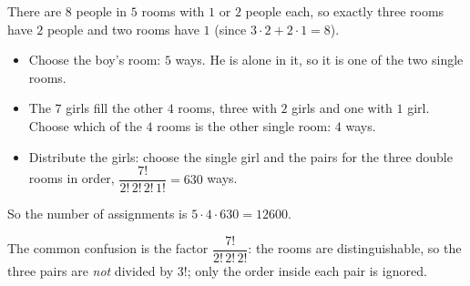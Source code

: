 There are $8$ people in $5$ rooms with $1$ or $2$ people each, so exactly three rooms have $2$ people and two rooms have $1$ (since $3\cdot2+2\cdot1=8$).

\begin{itemize}
\item Choose the boy's room: $5$ ways. He is alone in it, so it is one of the two single rooms.
\item The $7$ girls fill the other $4$ rooms, three with $2$ girls and one with $1$ girl. Choose which of the $4$ rooms is the other single room: $4$ ways.
\item Distribute the girls: choose the single girl and the pairs for the three double rooms in order, $\dfrac{7!}{2!\,2!\,2!\,1!}=630$ ways.
\end{itemize}
So the number of assignments is $5\cdot4\cdot630=\boxed{12600}$.

The common confusion is the factor $\dfrac{7!}{2!\,2!\,2!}$: the rooms are distinguishable, so the three pairs are \emph{not} divided by $3!$; only the order inside each pair is ignored.
